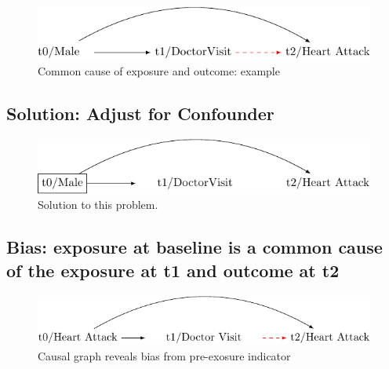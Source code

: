 \documentclass[
  singlecolumn]{report}
\begin{document}
\begin{figure}

{\centering \includegraphics[width=1\textwidth,height=\textheight]{causal-dags_files/figure-pdf/fig-dag-1-1.pdf}

}

\caption{\label{fig-dag-1}Common cause of exposure and outcome: example}

\end{figure}

\hypertarget{solution-adjust-for-confounder}{%
\subsection{Solution: Adjust for
Confounder}\label{solution-adjust-for-confounder}}

\begin{figure}

{\centering \includegraphics[width=1\textwidth,height=\textheight]{causal-dags_files/figure-pdf/fig-dag-2-1.pdf}

}

\caption{\label{fig-dag-2}Solution to this problem.}

\end{figure}

\hypertarget{bias-exposure-at-baseline-is-a-common-cause-of-the-exposure-at-t1-and-outcome-at-t2}{%
\subsection{Bias: exposure at baseline is a common cause of the exposure
at t1 and outcome at
t2}\label{bias-exposure-at-baseline-is-a-common-cause-of-the-exposure-at-t1-and-outcome-at-t2}}

\begin{figure}

{\centering \includegraphics[width=1\textwidth,height=\textheight]{causal-dags_files/figure-pdf/fig-dag-3-1.pdf}

}

\caption{\label{fig-dag-3}Causal graph reveals bias from pre-exosure
indicator}

\end{figure}
\end{document}
